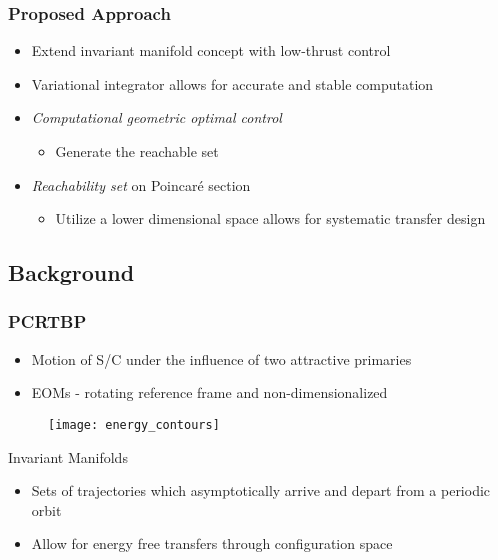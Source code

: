 \documentclass[11pt,professionalfonts]{beamer}
\begin{document}
\begin{frame} %
\frametitle{Proposed Approach}
		\begin{itemize}
			\item Extend invariant manifold concept with low-thrust control  
			\item Variational integrator allows for accurate and stable computation
			\item \emph{Computational geometric optimal control}
			\begin{itemize}
				\item Generate the reachable set
			\end{itemize}
			\item \emph{Reachability set} on Poincar\'e section 
			\begin{itemize}
				\item Utilize a lower dimensional space allows for systematic transfer design
			\end{itemize}
		\end{itemize}
\end{frame} %

\subsection{Background}
\begin{frame}
	\frametitle{PCRTBP}
	\begin{itemize}
		\item Motion of S/C under the influence of two attractive primaries
		\item EOMs - rotating reference frame and non-dimensionalized
	\end{itemize}
	\begin{figure}
		\centering
		\texttt{[image: energy\_contours]}
	\end{figure}
	
\end{frame}

\begin{frame}{Invariant Manifolds} %
\begin{itemize}
	\item Sets of trajectories which asymptotically arrive and depart from a periodic orbit
	\item Allow for energy free transfers through configuration space
\end{itemize}
	\begin{figure}
		\centering
	\end{figure}
\end{frame} %
\end{document}
